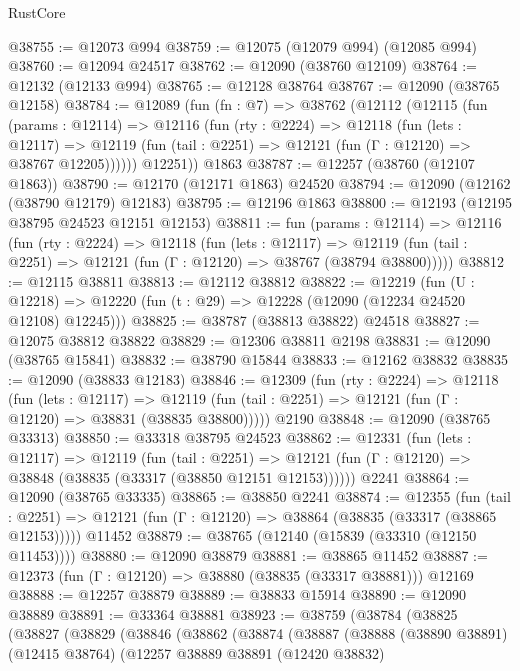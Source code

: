 \begin{lexlean}{RustCore}
\begin{coremodule}
@38755 := @12073 @994
@38759 := @12075 (@12079 @994) (@12085 @994)
@38760 := @12094 @24517
@38762 := @12090 (@38760 @12109)
@38764 := @12132 (@12133 @994)
@38765 := @12128 @38764
@38767 := @12090 (@38765 @12158)
@38784 := @12089
    (fun (fn : @7) =>
    @38762
      (@12112
        (@12115
          (fun (params : @12114) =>
          @12116
            (fun (rty : @2224) =>
            @12118
              (fun (lets : @12117) =>
              @12119 (fun (tail : @2251) => @12121 (fun (Γ : @12120) => @38767 @12205))))))
        @12251))
    @1863
@38787 := @12257 (@38760 (@12107 @1863))
@38790 := @12170 (@12171 @1863) @24520
@38794 := @12090 (@12162 (@38790 @12179) @12183)
@38795 := @12196 @1863
@38800 := @12193 (@12195 @38795 @24523 @12151 @12153)
@38811 := fun (params : @12114) =>
  @12116
    (fun (rty : @2224) =>
    @12118
      (fun (lets : @12117) =>
      @12119 (fun (tail : @2251) => @12121 (fun (Γ : @12120) => @38767 (@38794 @38800)))))
@38812 := @12115 @38811
@38813 := @12112 @38812
@38822 := @12219
    (fun (U : @12218) => @12220 (fun (t : @29) => @12228 (@12090 (@12234 @24520 @12108) @12245)))
@38825 := @38787 (@38813 @38822) @24518
@38827 := @12075 @38812 @38822
@38829 := @12306 @38811 @2198
@38831 := @12090 (@38765 @15841)
@38832 := @38790 @15844
@38833 := @12162 @38832
@38835 := @12090 (@38833 @12183)
@38846 := @12309
    (fun (rty : @2224) =>
    @12118
      (fun (lets : @12117) =>
      @12119 (fun (tail : @2251) => @12121 (fun (Γ : @12120) => @38831 (@38835 @38800)))))
    @2190
@38848 := @12090 (@38765 @33313)
@38850 := @33318 @38795 @24523
@38862 := @12331
    (fun (lets : @12117) =>
    @12119
      (fun (tail : @2251) =>
      @12121 (fun (Γ : @12120) => @38848 (@38835 (@33317 (@38850 @12151 @12153))))))
    @2241
@38864 := @12090 (@38765 @33335)
@38865 := @38850 @2241
@38874 := @12355
    (fun (tail : @2251) => @12121 (fun (Γ : @12120) => @38864 (@38835 (@33317 (@38865 @12153)))))
    @11452
@38879 := @38765 (@12140 (@15839 (@33310 (@12150 @11453))))
@38880 := @12090 @38879
@38881 := @38865 @11452
@38887 := @12373 (fun (Γ : @12120) => @38880 (@38835 (@33317 @38881))) @12169
@38888 := @12257 @38879
@38889 := @38833 @15914
@38890 := @12090 @38889
@38891 := @33364 @38881
@38923 := @38759
    (@38784
      (@38825
        (@38827
          (@38829
            (@38846
              (@38862
                (@38874
                  (@38887
                    (@38888
                      (@38890 @38891)
                      (@12415 @38764)
                      (@12257
                        @38889
                        @38891
                        (@12420 @38832)

\end{coremodule}
\end{lexlean}
